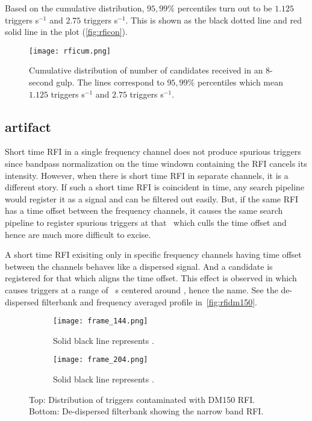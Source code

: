 \par Based on the cumulative distribution, $95,99\%$ percentiles turn out to be $1.125$ triggers s$^{-1}$ and $2.75$ triggers s$^{-1}$. This is shown as the black dotted line and red solid line in the plot (\autoref{fig:rficon}).

\begin{figure}
	\centering
	\label{fig:rficon}
	\texttt{[image: rficum.png]}
	\caption{Cumulative distribution of number of candidates received in an $8$-second gulp.
		The lines correspond to $95,99\%$ percentiles which mean $1.125$ triggers s$^{-1}$ and $2.75$ triggers s$^{-1}$.
	}
\end{figure}

\subsection { artifact}
\label{ssub:dm150}

\par Short time RFI in a single frequency channel does not produce spurious triggers since bandpass normalization on the time windown containing the RFI cancels its intensity. 
However, when there is short time RFI in separate channels, it is a different story. 
If such a short time RFI is coincident in time, any search pipeline would register it as a  signal and can be filtered out easily.
But, if the same RFI has a time offset between the frequency channels, it causes the same search pipeline to register spurious triggers at that \dm~which culls the time offset and hence are much more difficult to excise.

\par A short time RFI exisiting only in specific frequency channels having time offset between the channels behaves like a dispersed signal. 
And a candidate is registered for that \dm which aligns the time offset.
This effect is observed in \vfps which causes triggers at a range of \dm~s centered around , hence the name. See the de-dispersed filterbank and frequency averaged profile in~\autoref{fig:rfidm150}.

\begin{figure}
	\centering
	\label{fig:rfidm150}
	\begin{subfigure}{0.45\textwidth}
		\centering
		\texttt{[image: frame\_144.png]}
		\caption{Solid black line represents .}
	\end{subfigure}
	\begin{subfigure}{0.45\textwidth}
		\centering
		\texttt{[image: frame\_204.png]}
		\caption{Solid black line represents .}
	\end{subfigure}
	\caption{Top: Distribution of triggers contaminated with DM150 RFI. Bottom: De-dispersed filterbank showing the narrow band RFI.}
\end{figure}

